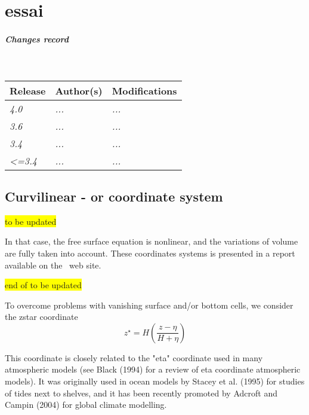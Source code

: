 \documentclass[../main/NEMO_manual]{subfiles}
\begin{document}
\chapter{ essai \zstar \sstar}

\chaptertoc

\paragraph{Changes record} ~\\

{\footnotesize
  \begin{tabularx}{\textwidth}{l||X|X}
    Release & Author(s) & Modifications \\
    \hline
    {\em   4.0} & {\em ...} & {\em ...} \\
    {\em   3.6} & {\em ...} & {\em ...} \\
    {\em   3.4} & {\em ...} & {\em ...} \\
    {\em <=3.4} & {\em ...} & {\em ...}
  \end{tabularx}
}

\clearpage

\section{Curvilinear \zstar- or \sstar coordinate system}

\colorbox{yellow}{ to be updated }

In that case, the free surface equation is nonlinear, and the variations of volume are fully taken into account.
These coordinates systems is presented in a report \citep{levier.treguier.ea_trpt07} available on the \NEMO\ web site.

\colorbox{yellow}{  end of to be updated}


To overcome problems with vanishing surface and/or bottom cells, we consider the zstar coordinate
\[
  z^\star = H \left( \frac{z-\eta}{H+\eta} \right)
\]

This coordinate is closely related to the "eta" coordinate used in many atmospheric models
(see Black (1994) for a review of eta coordinate atmospheric models).
It was originally used in ocean models by Stacey et al. (1995) for studies of tides next to shelves,
and it has been recently promoted by Adcroft and Campin (2004) for global climate modelling.
\end{document}
